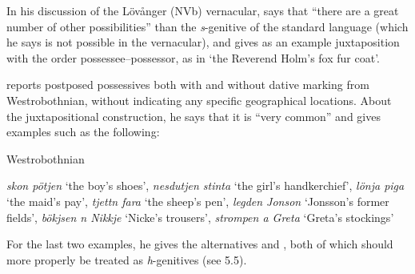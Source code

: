 
In his discussion of the Lövånger (NVb) vernacular, \citet[208]{Holm1942} says that “there are a great number of other possibilities” than the \textit{s}{}-genitive of the standard language (which he says is not possible in the vernacular), and gives as an example juxtaposition with the order possessee–possessor, as in  ‘the Reverend Holm’s fox fur coat’. 


\citet[125]{Larsson1929} reports postposed possessives both with and without dative marking from Westrobothnian, without indicating any specific geographical locations. About the juxtapositional construction, he says that it is “very common” and gives examples such as the following:


\item 

Westrobothnian



\textit{skon pötjen} ‘the boy’s shoes’, \textit{nesdutjen stinta} ‘the girl’s handkerchief’, \textit{lönja piga} ‘the maid’s pay’, \textit{tjettn fara} ‘the sheep’s pen’, \textit{legden Jonson} ‘Jonsson’s former fields’, \textit{bökjsen n Nikkje} ‘Nicke’s trousers’, \textit{strompen a Greta} ‘Greta’s stockings’


For the last two examples, he gives the alternatives  and , both of which should more properly be treated as \textit{h}{}-genitives (see 5.5).


